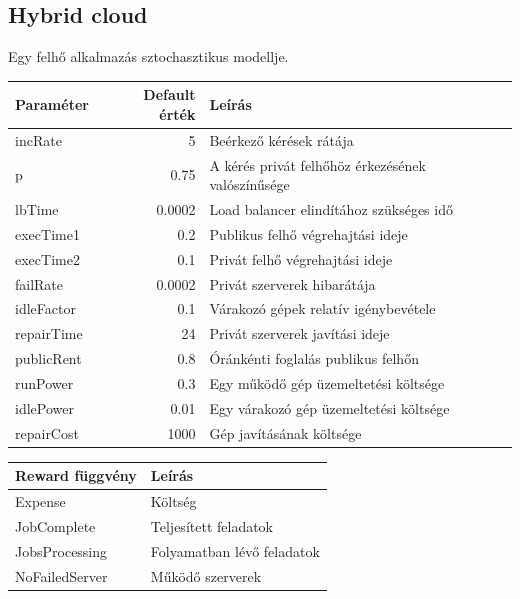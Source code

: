 \clearpage
\subsection{Hybrid cloud}

Egy felhő alkalmazás sztochasztikus modellje.
\begin{center}
	\begin{tabular}{lrl}
		\textbf{\textbf{Paraméter}} & \textbf{Default érték} & \textbf{Leírás} \\
		\hline
		incRate & 5& Beérkező kérések rátája\\
		p & 0.75 & A kérés privát felhőhöz érkezésének valószínűsége\\
		lbTime & 0.0002 & Load balancer elindítához szükséges idő\\
		execTime1 & 0.2 & Publikus felhő végrehajtási ideje\\
		execTime2 & 0.1 & Privát felhő végrehajtási ideje\\
		failRate & 0.0002 & Privát szerverek hibarátája\\
		idleFactor & 0.1 & Várakozó gépek relatív igénybevétele\\
		repairTime & 24 & Privát szerverek javítási ideje\\
		publicRent & 0.8 & Óránkénti foglalás publikus felhőn\\
		runPower & 0.3 & Egy működő gép üzemeltetési költsége\\
		idlePower & 0.01 & Egy várakozó gép üzemeltetési költsége\\
		repairCost & 1000 & Gép javításának költsége\\
	\end{tabular}
	\quad
	\begin{tabular}{ll}
		\textbf{\textbf{Reward függvény}} & \textbf{Leírás}\\
		\hline
		Expense & Költség\\
		JobComplete & Teljesített feladatok\\
		JobsProcessing & Folyamatban lévő feladatok\\
		NoFailedServer & Működő szerverek\\
	\end{tabular}
\end{center}

